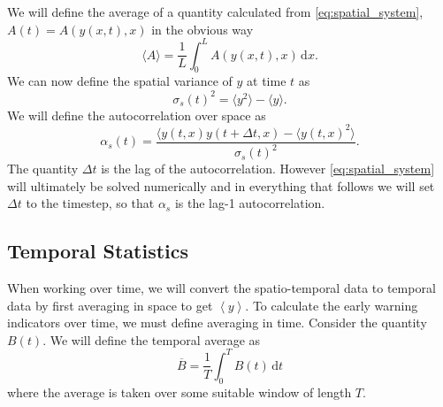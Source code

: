 We will define the average of a quantity calculated from \cref{eq:spatial_system}, $A(t) = A(y(x,t),x)$ in the obvious way
\begin{equation}
  \label{eq:definition_of_average}
  \langle A \rangle = \frac{1}{L}\int_0^L A(y(x,t),x) \,\mathrm{d}x.
\end{equation}
We can now define the spatial variance of $y$ at time $t$ as
\begin{equation}
  \label{eq:spatial_variance}
  \sigma_s(t)^2 = \langle y^2 \rangle - \langle y \rangle.
\end{equation}
We will define the autocorrelation over space as
\begin{equation}
  \label{eq:spatial_autocorrelation}
  \alpha_s(t) = \frac{\langle y(t,x)y(t+\Delta t,x) - \langle y(t,x)^2 \rangle }{\sigma_s(t)^2}.
\end{equation}
The quantity $\Delta t$ is the lag of the autocorrelation. However \cref{eq:spatial_system} will ultimately be solved numerically and
in everything that follows we will set $\Delta t$ to the timestep, so that $\alpha_s$ is the lag-1 autocorrelation.

\subsection{Temporal Statistics}
When working over time, we will convert the spatio-temporal data to temporal data by first averaging in space to get $\left\langle y \right\rangle$.
To calculate the early warning indicators over time, we must define averaging in time. Consider the quantity $B(t)$. We will
define the temporal average as
\begin{equation}
  \label{eq:definition_of_temporal_average}
  \overline{B} = \frac{1}{T}\int_0^TB(t)\,\mathrm{d}t
\end{equation}
where the average is taken over some suitable window of length $T$.

